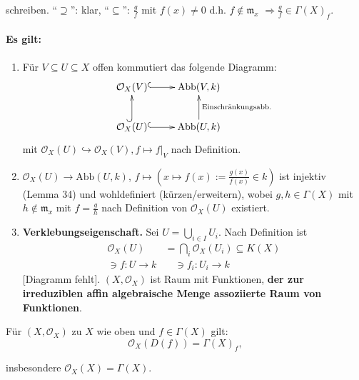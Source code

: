 schreiben. ``$\supseteq$'': klar, ``$\subseteq$'': $\frac{g}{f}$
mit $f(x)\neq0$ d.h. $f\notin\mathfrak{m}_{x}$ $\Rightarrow\frac{g}{f}\in\Gamma(X)_{f}$.


\paragraph{Es gilt:}
\begin{enumerate}
\item Für $V\subseteq U\subseteq X$ offen kommutiert das folgende Diagramm:
  \[
    \xymatrix{\mathcal{O}_{X}(V)\ar@{^{(}->}[r] & \text{Abb}(V,k)\\
      \mathcal{O}_{X}(U)\ar@{^{(}->}[r]\ar@{^{(}->}[u] & \text{Abb}(U,k)\ar[u]_{\text{Einschränkungsabb.}}
    }
  \]
  mit $\mathcal{O}_{X}(U) \hookrightarrow \mathcal{O}_{X}(V), f \mapsto f|_V$ nach Definition.
\item $\mathcal{O}_{X}(U)\rightarrow\text{Abb}(U,k)$, $f\mapsto(x\mapsto f(x):=\frac{g(x)}{f(x)}\in k)$
  ist injektiv (Lemma 34) und wohldefiniert (kürzen/erweitern), wobei
  $g,h\in\Gamma(X)$ mit $h\notin\mathfrak{m}_{x}$ mit $f=\frac{g}{h}$
  nach Definition von $\mathcal{O}_{X}(U)$ existiert.
\item \textbf{Verklebungseigenschaft.} Sei $U=\bigcup_{i\in I}U_{i}$. Nach
  Definition ist 
  \begin{align*}
    \mathcal{O}_{X}(U) & =\bigcap_{i}\mathcal{O}_{X}(U_{i})\subseteq K(X)\\
    \ni f:U\rightarrow k & \quad\ni f_{i}:U_{i}\rightarrow k
  \end{align*}
  {[}Diagramm fehlt{]}. $(X,\mathcal{O}_{X})$ ist Raum
  mit Funktionen, \textbf{der zur irreduziblen affin algebraische Menge
    assoziierte Raum von Funktionen}. 
\end{enumerate}
\begin{prop}[orig. 33]
  \label{prop:fkt-auf-basis}
  Für $(X,\mathcal{O}_{X})$ zu $X$ wie oben und $f\in\Gamma(X)$
  gilt:
  \[
    \mathcal{O}_{X}(D(f))=\Gamma(X)_{f},
  \]

  insbesondere $\mathcal{O}_{X}(X)=\Gamma(X)$.
\end{prop}
